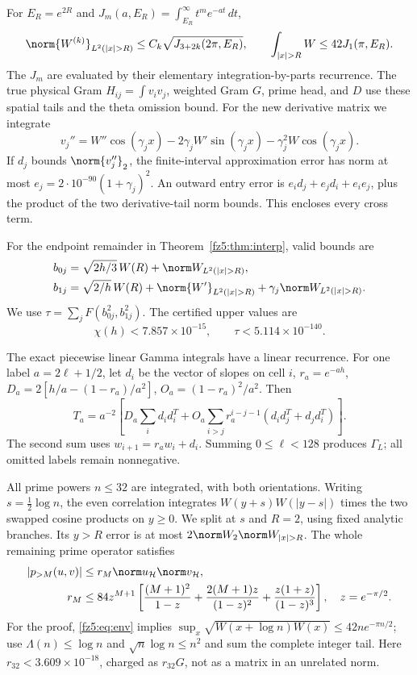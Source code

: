 \documentclass[11pt,a4paper]{article}
\numberwithin{equation}{section}
\theoremstyle{definition}\newtheorem{definition}[theorem]{Definition}
\theoremstyle{remark}\newtheorem{remark}[theorem]{Remark}
\newcommand{\Hh}{\mathcal H}\newcommand{\Hw}{\mathcal H}
\begin{document}
For $E_R=e^{2R}$ and $J_m(a,E_R)=\int_{E_R}^\infty t^me^{-at}\,dt$,
\[
 \norm{W^{(k)}}_{L^2(|x|>R)}\le C_k\sqrt{J_{3+2k}(2\pi,E_R)},
 \qquad \int_{|x|>R}W\le42J_1(\pi,E_R).
\]
The $J_m$ are evaluated by their elementary integration-by-parts recurrence.
The true physical Gram $H_{ij}=\int v_iv_j$, weighted Gram $G$, prime
head, and $D$ use these spatial tails and the theta omission bound.
For the new derivative matrix we integrate
\[
 v_j''=W''\cos(\gamma_jx)-2\gamma_jW'\sin(\gamma_jx)
                         -\gamma_j^2W\cos(\gamma_jx).
\]
If $d_j$ bounds $\norm{v_j''}_2$, the finite-interval approximation error
has norm at most $e_j=2\cdot10^{-90}(1+\gamma_j)^2$.
An outward entry error is $e_id_j+e_jd_i+e_ie_j$, plus the product of
the two derivative-tail norm bounds. This encloses every cross term.

For the endpoint remainder in Theorem~\ref{fz5:thm:interp}, valid bounds are
\begin{align*}
 b_{0j}&=\sqrt{2h/3}\,W(R)+\norm W_{L^2(|x|>R)},\\
 b_{1j}&=\sqrt{2/h}\,W(R)+\norm{W'}_{L^2(|x|>R)}
                           +\gamma_j\norm W_{L^2(|x|>R)}.
\end{align*}
We use $\tau=\sum_j F(b_{0j}^2,b_{1j}^2)$. The certified upper values are
\[
 \chi(h)<7.857\times10^{-15},\qquad \tau<5.114\times10^{-140}.
\]

The exact piecewise linear Gamma integrals have a linear recurrence.
For one label $a=2\ell+1/2$, let $d_i$ be the vector of slopes on cell $i$,
$r_a=e^{-ah}$, $D_a=2[h/a-(1-r_a)/a^2]$, $O_a=(1-r_a)^2/a^2$.
Then
\[
 T_a=a^{-2}\left[D_a\sum_i d_id_i^T+
 O_a\sum_{i>j}r_a^{i-j-1}(d_id_j^T+d_jd_i^T)\right].
\]
The second sum uses $w_{i+1}=r_aw_i+d_i$. Summing $0\le\ell<128$
produces $\Gamma_L$; all omitted labels remain nonnegative.

All prime powers $n\le32$ are integrated, with both orientations.
Writing $s=\frac12\log n$, the even correlation integrates
$W(y+s)W(|y-s|)$ times the two swapped cosine products on $y\ge0$.
We split at $s$ and $R=2$, using fixed analytic branches. Its $y>R$
error is at most $2\norm W_2\norm W_{|x|>R}$.
The whole remaining prime operator satisfies
\begin{align}
 |p_{>M}(u,v)|&\le r_M\norm u_\Hh\norm v_\Hh,\\
 r_M&\le84z^{M+1}\left[\frac{(M+1)^2}{1-z}
       +\frac{2(M+1)z}{(1-z)^2}+\frac{z(1+z)}{(1-z)^3}\right],
 \quad z=e^{-\pi/2}.\label{fz5:eq:prime}
\end{align}
For the proof, \eqref{fz5:eq:env} implies
$\sup_x\sqrt{W(x+\log n)W(x)}\le42n e^{-\pi n/2}$;
use $\Lambda(n)\le\log n$ and $\sqrt n\log n\le n^2$ and sum the
complete integer tail. Here $r_{32}<3.609\times10^{-18}$, charged as
$r_{32}G$, not as a matrix in an unrelated norm.
\end{document}
